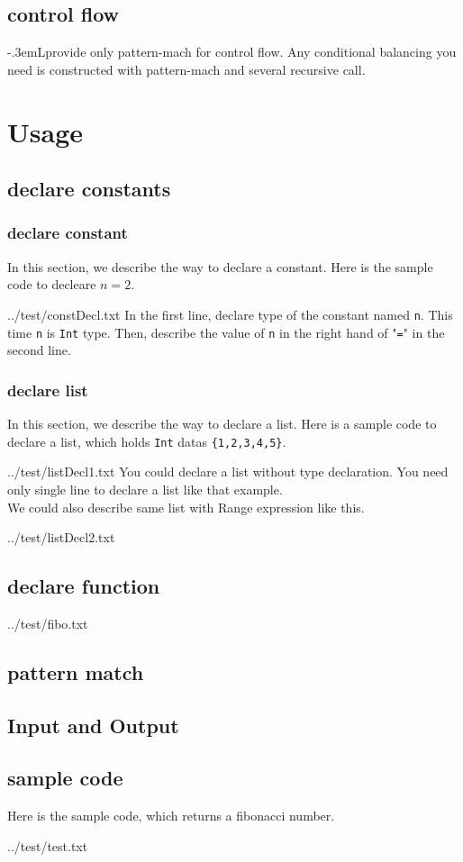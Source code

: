 \documentclass[openany,b5j,11pt,english]{jsbook}
\def\EL{\reflectbox{E}\kern-.3em\hbox{L}}
\begin{document}
\section{control flow}
\EL\;provide only pattern-mach for control flow. Any conditional balancing you need is constructed with pattern-mach and several recursive call.
\chapter{Usage}
\section{declare constants}
\subsection{declare constant}
In this section, we describe the way to declare a constant.
Here is the sample code to decleare $n = 2$.

{../test/constDecl.txt}
In the first line, declare type of the constant named \texttt{n}. This time \texttt{n} is \texttt{Int} type.
Then, describe the value of \texttt{n} in the right hand of "\texttt{=}" in the second line. 
\subsection{declare list}
In this section, we describe the way to declare a list.
Here is a sample code to declare a list, which holds \texttt{Int} datas \texttt{\{1,2,3,4,5\}}. 

{../test/listDecl1.txt}
You could declare a list without type declaration.
You need only single line to declare a list like that example.\\

We could also describe same list with \textsf{Range} expression like this.

{../test/listDecl2.txt}

\section{declare function}

{../test/fibo.txt}
\section{pattern match}
\section{Input and Output}
\section{sample code}
Here is the sample code, which returns a fibonacci number.

{../test/test.txt}
\end{document}
